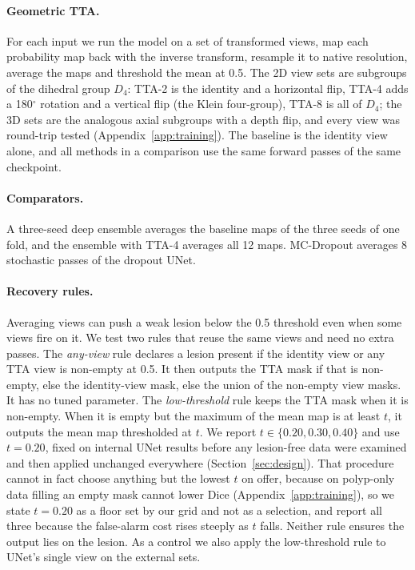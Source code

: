 \paragraph{Geometric TTA.} For each input we run the model on a set of transformed views, map each probability map back with the inverse transform, resample it to native resolution, average the maps and threshold the mean at 0.5. The 2D view sets are subgroups of the dihedral group $D_4$: TTA-2 is the identity and a horizontal flip, TTA-4 adds a 180$^\circ$ rotation and a vertical flip (the Klein four-group), TTA-8 is all of $D_4$; the 3D sets are the analogous axial subgroups with a depth flip, and every view was round-trip tested (Appendix~\ref{app:training}). The baseline is the identity view alone, and all methods in a comparison use the same forward passes of the same checkpoint.

\paragraph{Comparators.} A three-seed deep ensemble \cite{lakshminarayanan2017ensembles} averages the baseline maps of the three seeds of one fold, and the ensemble with TTA-4 averages all 12 maps. MC-Dropout averages 8 stochastic passes of the dropout UNet.

\paragraph{Recovery rules.} Averaging views can push a weak lesion below the 0.5 threshold even when some views fire on it. We test two rules that reuse the same views and need no extra passes. The \emph{any-view} rule declares a lesion present if the identity view or any TTA view is non-empty at 0.5. It then outputs the TTA mask if that is non-empty, else the identity-view mask, else the union of the non-empty view masks. It has no tuned parameter. The \emph{low-threshold} rule keeps the TTA mask when it is non-empty. When it is empty but the maximum of the mean map is at least $t$, it outputs the mean map thresholded at $t$. We report $t\in\{0.20, 0.30, 0.40\}$ and use $t=0.20$, fixed on internal UNet results before any lesion-free data were examined and then applied unchanged everywhere (Section~\ref{sec:design}). That procedure cannot in fact choose anything but the lowest $t$ on offer, because on polyp-only data filling an empty mask cannot lower Dice (Appendix~\ref{app:training}), so we state $t=0.20$ as a floor set by our grid and not as a selection, and report all three because the false-alarm cost rises steeply as $t$ falls. Neither rule ensures the output lies on the lesion. As a control we also apply the low-threshold rule to UNet's single view on the external sets.


